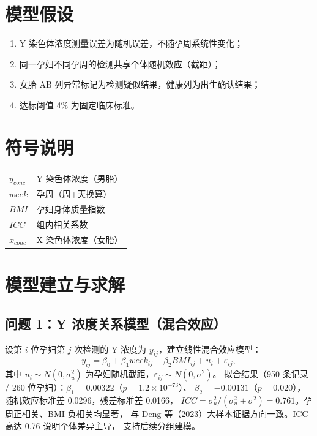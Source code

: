 \documentclass[11pt]{ctexart}
\begin{document}
\section{模型假设}\label{sec:assumptions}
\begin{enumerate}
  \item Y 染色体浓度测量误差为随机误差，不随孕周系统性变化；
  \item 同一孕妇不同孕周的检测共享个体随机效应（截距）；
  \item 女胎 AB 列异常标记为检测疑似结果，健康列为出生确认结果；
  \item 达标阈值 4\% 为固定临床标准。
\end{enumerate}

\section{符号说明}\label{sec:symbols}
\begin{tabular}{ll}
$y_{conc}$ & Y 染色体浓度（男胎）\\
$week$ & 孕周（周+天换算）\\
$BMI$ & 孕妇身体质量指数\\
$ICC$ & 组内相关系数\\
$x_{conc}$ & X 染色体浓度（女胎）\\
\end{tabular}

\section{模型建立与求解}\label{sec:model}

\subsection{问题 1：Y 浓度关系模型（混合效应）}\label{sec:q1}
设第 $i$ 位孕妇第 $j$ 次检测的 Y 浓度为 $y_{ij}$，建立线性混合效应模型：
\begin{equation}
y_{ij} = \beta_0 + \beta_1 week_{ij} + \beta_2 BMI_{ij} + u_i + \varepsilon_{ij},
\label{eq:q1}
\end{equation}
其中 $u_i \sim N(0,\sigma_u^2)$ 为孕妇随机截距，$\varepsilon_{ij} \sim N(0,\sigma^2)$。
拟合结果（950 条记录 / 260 位孕妇）：$\beta_1=0.00322$（$p=1.2\times10^{-73}$）、
$\beta_2=-0.00131$（$p=0.020$），随机效应标准差 0.0296，残差标准差 0.0166，
$ICC=\sigma_u^2/(\sigma_u^2+\sigma^2)=0.761$。孕周正相关、BMI 负相关均显著，
与 Deng 等（2023）大样本证据方向一致。ICC 高达 0.76 说明个体差异主导，
支持后续分组建模。
\end{document}
